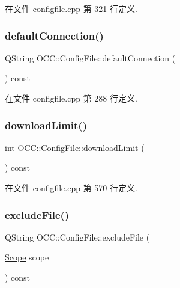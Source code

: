 在文件 configfile.\+cpp 第 321 行定义.

\mbox{\label{class_o_c_c_1_1_config_file_a7e76c0a3faff2b37e3eea63ebb6efb57}} 
\subsubsection{\texorpdfstring{default\+Connection()}{defaultConnection()}}
{\footnotesize\ttfamily Q\+String O\+C\+C\+::\+Config\+File\+::default\+Connection (\begin{DoxyParamCaption}{ }\end{DoxyParamCaption}) const}



在文件 configfile.\+cpp 第 288 行定义.

\mbox{\label{class_o_c_c_1_1_config_file_a06569c093c116eb187791d9f3a63fb75}} 
\subsubsection{\texorpdfstring{download\+Limit()}{downloadLimit()}}
{\footnotesize\ttfamily int O\+C\+C\+::\+Config\+File\+::download\+Limit (\begin{DoxyParamCaption}{ }\end{DoxyParamCaption}) const}



在文件 configfile.\+cpp 第 570 行定义.

\mbox{\label{class_o_c_c_1_1_config_file_a01f021637a0819006fb8a10245bd1b0c}} 
\subsubsection{\texorpdfstring{exclude\+File()}{excludeFile()}}
{\footnotesize\ttfamily Q\+String O\+C\+C\+::\+Config\+File\+::exclude\+File (\begin{DoxyParamCaption}\item[{\hyperlink{class_o_c_c_1_1_config_file_ab571084ce59ba92b0ce4079460b7c869}{Scope}}]{scope }\end{DoxyParamCaption}) const}



